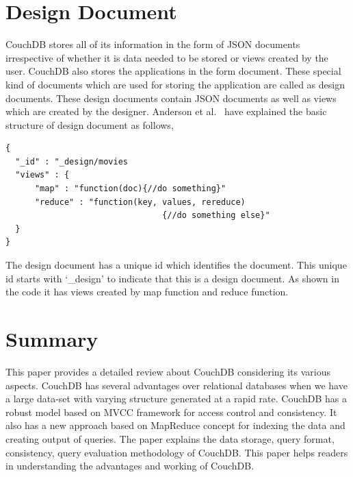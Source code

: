 \documentclass{sig-alternate}
\begin{document}
\section{Design Document}
\label{design document}
CouchDB stores all of its information in the form of JSON documents irrespective of whether it is data needed to be stored or views created by the user. CouchDB also stores the applications in the form document. These special kind of documents which are used for storing the application are called as design documents. These design documents contain JSON documents as well as views which are created by the designer. Anderson et al.~\cite{Anderson:CouchDB} have explained the basic structure of design document as follows,
\begin{verbatim}
{
  "_id" : "_design/movies
  "views" : {
      "map" : "function(doc){//do something}"
      "reduce" : "function(key, values, rereduce)
                                {//do something else}"
  }
}
\end{verbatim}
The design document has a unique id which identifies the document. This unique id starts with `\_design' to indicate that this is a design document. As shown in the code it has views created by map function and reduce function.

\section{Summary}
\label{summary}
This paper provides a detailed review about CouchDB considering its various aspects. CouchDB has several advantages over relational databases when we have a large data-set with varying structure generated at a rapid rate. CouchDB has a robust model based on MVCC framework for access control and consistency. It also has a new approach based on MapReduce concept for indexing the data and creating output of queries. The paper explains the data storage, query format, consistency, query evaluation methodology of CouchDB. This paper helps readers in understanding the advantages and working of CouchDB.





\balance
\end{document}

